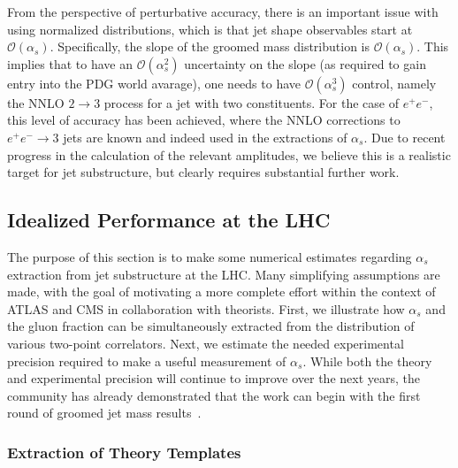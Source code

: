 \documentclass[11pt]{cernrep}
\begin{document}
From the perspective of perturbative accuracy, there is an important issue with using normalized distributions, which is that jet shape observables start at $\mathcal{O}(\alpha_s)$.
%
Specifically, the slope of the groomed mass distribution is $\mathcal{O}(\alpha_s)$.
%
This implies that to have an $\mathcal{O}(\alpha_s^2)$ uncertainty on the slope (as required to gain entry into the PDG world avarage), one needs to have $\mathcal{O}(\alpha_s^3)$ control, namely the NNLO $2 \to 3$ process for a jet with two constituents.
%
For the case of $e^+e^-$, this level of accuracy has been achieved, where the NNLO corrections to $e^+e^-\to 3$ jets are known and indeed used in the extractions of $\alpha_s$.
%
Due to recent progress in the calculation of the relevant amplitudes, we believe this is a realistic target for jet substructure, but clearly requires substantial further work.

\subsection{Idealized Performance at the LHC}
\label{jetsub_alphas_sec:ben_study}

The purpose of this section is to make some numerical estimates regarding $\alpha_s$ extraction from jet substructure at the LHC.
%
Many simplifying assumptions are made, with the goal of motivating a more complete effort within the context of ATLAS and CMS in collaboration with theorists.
%
First, we illustrate how $\alpha_s$ and the gluon fraction can be simultaneously extracted from the distribution of various two-point correlators.
%
Next, we estimate the needed experimental precision required to make a useful measurement of $\alpha_s$.
%
While both the theory and experimental precision will continue to improve over the next years, the community has already demonstrated that the work can begin with the first round of groomed jet mass results~\cite{Aaboud:2017qwh,CMS-PAS-SMP-16-010,Frye:2016aiz,Frye:2016okc,Marzani:2017mva,Marzani:2017kqd}.

\subsubsection{Extraction of Theory Templates}
\label{jetsub_alphas_sec:templates}
\end{document}
